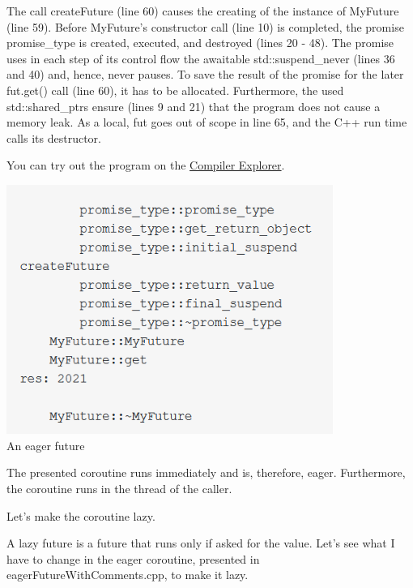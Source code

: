 The call createFuture (line 60) causes the creating of the instance of MyFuture (line 59). Before MyFuture’s constructor call (line 10) is completed, the promise promise\_type is created, executed, and destroyed (lines 20 - 48). The promise uses in each step of its control flow the awaitable std::suspend\_never (lines 36 and 40) and, hence, never pauses. To save the result of the promise for the later fut.get() call (line 60), it has to be allocated. Furthermore, the used std::shared\_ptrs ensure (lines 9 and 21) that the program does not cause a memory leak. As a local, fut goes out of scope in line 65, and the C++ run time calls its destructor.

You can try out the program on the \href{https://godbolt.org/z/Y9naEx}{Compiler Explorer}.

\begin{center}
\includegraphics[width=0.8\textwidth]{content/3/chapter7/images/8.png}\\
An eager future
\end{center}

The presented coroutine runs immediately and is, therefore, eager. Furthermore, the coroutine runs in the thread of the caller.

Let’s make the coroutine lazy.


A lazy future is a future that runs only if asked for the value. Let’s see what I have to change in the eager coroutine, presented in eagerFutureWithComments.cpp, to make it lazy.

